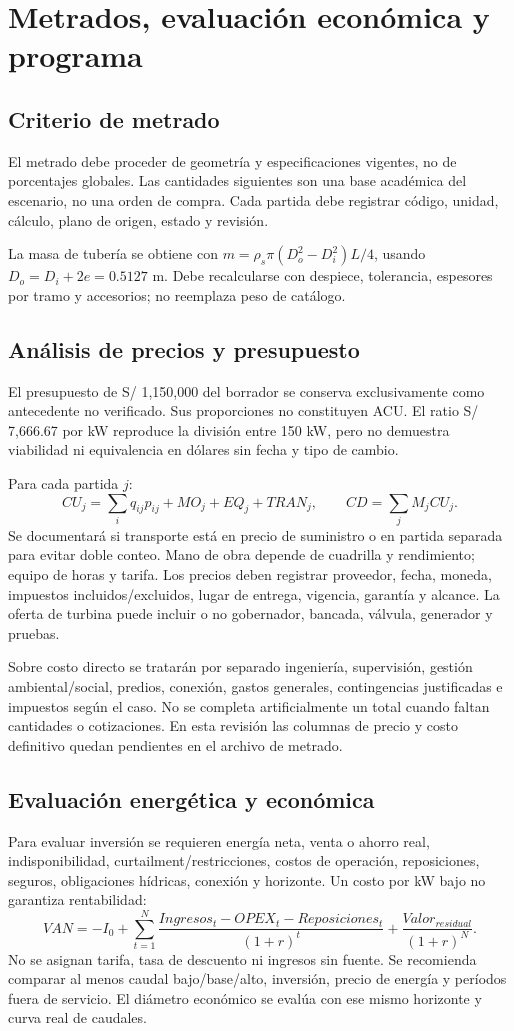 \chapter{Metrados, evaluación económica y programa}
\section{Criterio de metrado}
El metrado debe proceder de geometría y especificaciones vigentes, no de porcentajes globales. Las cantidades siguientes son una base académica del escenario, no una orden de compra. Cada partida debe registrar código, unidad, cálculo, plano de origen, estado y revisión.

\small\normalsize
La masa de tubería se obtiene con $m=\rho_s\pi(D_o^2-D_i^2)L/4$, usando $D_o=D_i+2e=0.5127$ m. Debe recalcularse con despiece, tolerancia, espesores por tramo y accesorios; no reemplaza peso de catálogo.

\section{Análisis de precios y presupuesto}
El presupuesto de S/ 1,150,000 del borrador se conserva exclusivamente como antecedente no verificado. Sus proporciones no constituyen ACU. El ratio S/ 7,666.67 por kW reproduce la división entre 150 kW, pero no demuestra viabilidad ni equivalencia en dólares sin fecha y tipo de cambio.

Para cada partida $j$:
\[
CU_j=\sum_i q_{ij}p_{ij}+MO_j+EQ_j+TRAN_j,\qquad CD=\sum_j M_jCU_j.
\]
Se documentará si transporte está en precio de suministro o en partida separada para evitar doble conteo. Mano de obra depende de cuadrilla y rendimiento; equipo de horas y tarifa. Los precios deben registrar proveedor, fecha, moneda, impuestos incluidos/excluidos, lugar de entrega, vigencia, garantía y alcance. La oferta de turbina puede incluir o no gobernador, bancada, válvula, generador y pruebas.

Sobre costo directo se tratarán por separado ingeniería, supervisión, gestión ambiental/social, predios, conexión, gastos generales, contingencias justificadas e impuestos según el caso. No se completa artificialmente un total cuando faltan cantidades o cotizaciones. En esta revisión las columnas de precio y costo definitivo quedan pendientes en el archivo de metrado.

\section{Evaluación energética y económica}
Para evaluar inversión se requieren energía neta, venta o ahorro real, indisponibilidad, curtailment/restricciones, costos de operación, reposiciones, seguros, obligaciones hídricas, conexión y horizonte. Un costo por kW bajo no garantiza rentabilidad:
\[
VAN=-I_0+\sum_{t=1}^{N}\frac{Ingresos_t-OPEX_t-Reposiciones_t}{(1+r)^t}
+\frac{Valor_{residual}}{(1+r)^N}.
\]
No se asignan tarifa, tasa de descuento ni ingresos sin fuente. Se recomienda comparar al menos caudal bajo/base/alto, inversión, precio de energía y períodos fuera de servicio. El diámetro económico se evalúa con ese mismo horizonte y curva real de caudales.

